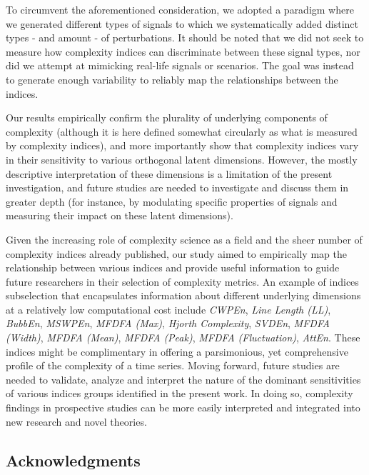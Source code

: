 \documentclass[
  man]{apa6}
\begin{document}
To circumvent the aforementioned consideration, we adopted a paradigm where we generated different types of signals to which we systematically added distinct types - and amount - of perturbations. It should be noted that we did not seek to measure how complexity indices can discriminate between these signal types, nor did we attempt at mimicking real-life signals or scenarios. The goal was instead to generate enough variability to reliably map the relationships between the indices.

Our results empirically confirm the plurality of underlying components of complexity (although it is here defined somewhat circularly as what is measured by complexity indices), and more importantly show that complexity indices vary in their sensitivity to various orthogonal latent dimensions. However, the mostly descriptive interpretation of these dimensions is a limitation of the present investigation, and future studies are needed to investigate and discuss them in greater depth (for instance, by modulating specific properties of signals and measuring their impact on these latent dimensions).

Given the increasing role of complexity science as a field and the sheer number of complexity indices already published, our study aimed to empirically map the relationship between various indices and provide useful information to guide future researchers in their selection of complexity metrics. An example of indices subselection that encapsulates information about different underlying dimensions at a relatively low computational cost include \emph{CWPEn}, \emph{Line Length (LL)}, \emph{BubbEn}, \emph{MSWPEn}, \emph{MFDFA (Max)}, \emph{Hjorth Complexity}, \emph{SVDEn}, \emph{MFDFA (Width)}, \emph{MFDFA (Mean)}, \emph{MFDFA (Peak)}, \emph{MFDFA (Fluctuation)}, \emph{AttEn}. These indices might be complimentary in offering a parsimonious, yet comprehensive profile of the complexity of a time series. Moving forward, future studies are needed to validate, analyze and interpret the nature of the dominant sensitivities of various indices groups identified in the present work. In doing so, complexity findings in prospective studies can be more easily interpreted and integrated into new research and novel theories.

\hypertarget{acknowledgments}{%
\subsection{Acknowledgments}\label{acknowledgments}}
\end{document}
